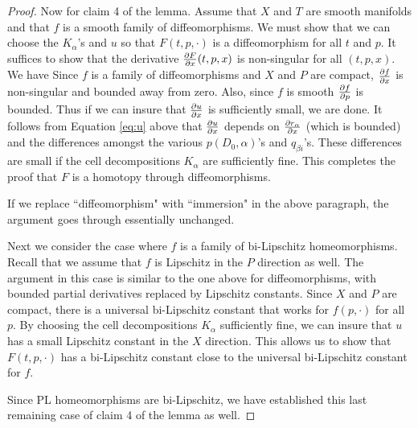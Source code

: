 \begin{proof}
\medskip

Now for claim 4 of the lemma.
Assume that $X$ and $T$ are smooth manifolds and that $f$ is a smooth family of diffeomorphisms.
We must show that we can choose the $K_\alpha$'s and $u$ so that $F(t, p, \cdot)$ is a 
diffeomorphism for all $t$ and $p$.
It suffices to 
show that the derivative $\frac{\partial F}{\partial x}(t, p, x)$ is non-singular for all $(t, p, x)$.
We have
Since $f$ is a family of diffeomorphisms and $X$ and $P$ are compact, 
$\frac{\partial f}{\partial x}$ is non-singular and bounded away from zero.
Also, since $f$ is smooth $\frac{\partial f}{\partial p}$ is bounded.
Thus if we can insure that $\frac{\partial u}{\partial x}$ is sufficiently small, we are done.
It follows from Equation \eqref{eq:u} above that $\frac{\partial u}{\partial x}$ depends on $\frac{\partial r_\alpha}{\partial x}$
(which is bounded)
and the differences amongst the various $p(D_0,\alpha)$'s and $q_{\beta i}$'s.
These differences are small if the cell decompositions $K_\alpha$ are sufficiently fine.
This completes the proof that $F$ is a homotopy through diffeomorphisms.

If we replace ``diffeomorphism" with ``immersion" in the above paragraph, the argument goes
through essentially unchanged.

Next we consider the case where $f$ is a family of bi-Lipschitz homeomorphisms.
Recall that we assume that $f$ is Lipschitz in the $P$ direction as well.
The argument in this case is similar to the one above for diffeomorphisms, with
bounded partial derivatives replaced by Lipschitz constants.
Since $X$ and $P$ are compact, there is a universal bi-Lipschitz constant that works for 
$f(p, \cdot)$ for all $p$.
By choosing the cell decompositions $K_\alpha$ sufficiently fine,
we can insure that $u$ has a small Lipschitz constant in the $X$ direction.
This allows us to show that $F(t, p, \cdot)$ has a bi-Lipschitz constant
close to the universal bi-Lipschitz constant for $f$.

Since PL homeomorphisms are bi-Lipschitz, we have established this last remaining case of claim 4 of the lemma as well.
\end{proof}



